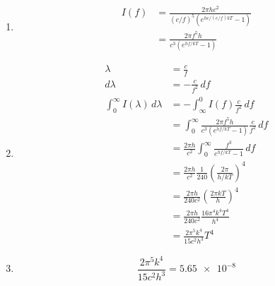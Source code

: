 \documentclass{article}
\begin{document}
\begin{enumerate}
  \item

        \begin{align*}
          I(f) & = \frac{2 \pi h c^2}{(c / f)^5 (e^{h c / (c / f) k T} - 1)} \\
               & = \frac{2 \pi f^5 h}{c^3 (e^{h f / k T} - 1)}
        \end{align*}

  \item

        \begin{align*}
          \lambda                             & = \frac{c}{f}                                                                  \\
          d \lambda                           & = -\frac{c}{f^2} \,df                                                          \\
          \int_0^\infty I(\lambda) \,d\lambda & = -\int_\infty^0 I(f) \frac{c}{f^2} \,df                                       \\
                                              & = \int_0^\infty \frac{2 \pi f^5 h}{c^3 (e^{h f / k T} - 1)} \frac{c}{f^2} \,df \\
                                              & = \frac{2 \pi h}{c^2} \int_0^\infty \frac{f^3}{e^{h f / k T} - 1} \,df         \\
                                              & = \frac{2 \pi h}{c^2} \frac{1}{240} \left( \frac{2 \pi}{h / k T} \right)^4     \\
                                              & = \frac{2 \pi h}{240 c^2} \left( \frac{2 \pi k T}{h} \right)^4                 \\
                                              & = \frac{2 \pi h}{240 c^2} \frac{16 \pi^4 k^4 T^4}{h^4}                         \\
                                              & = \frac{2 \pi^5 k^4}{15 c^2 h^3} T^4
        \end{align*}

  \item \[\frac{2 \pi^5 k^4}{15 c^2 h^3} = \num{5.65e-8}\]
\end{enumerate}

\setcounter{subsubsection}{62}
\subsubsection{}
\end{document}
